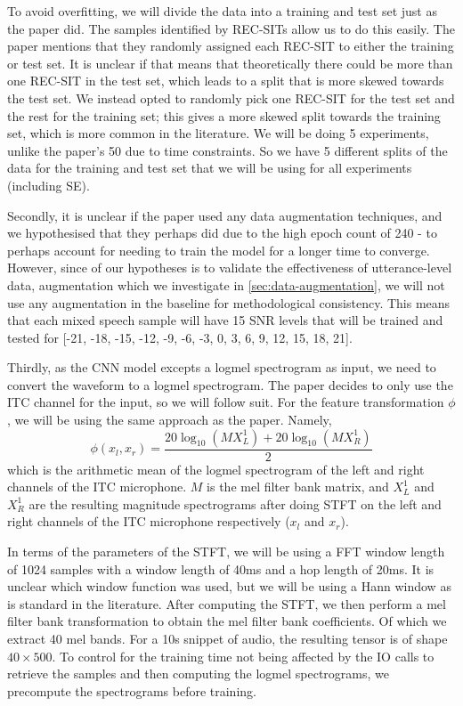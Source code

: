 \documentclass[logo,bsc,singlespacing,parskip,online]{infthesis}
\begin{document}
To avoid overfitting, we will divide the data into a training and test set just as the paper did.
The samples identified by REC-SITs allow us to do this easily. The paper mentions that they randomly 
assigned each REC-SIT to either the training or test set. It is unclear if 
that means that theoretically there could be more than one REC-SIT in the test set, which 
leads to a split that is more skewed towards the test set. We instead opted to randomly pick 
one REC-SIT for the test set and the rest for the training set; this gives a more 
skewed split towards the training set, which is more common in the literature.
We will be doing 5 experiments, unlike the paper's 50 due to time constraints. So 
we have 5 different splits of the data for the training and test set that we will be using 
for all experiments (including SE).

Secondly, it is unclear if the paper used any data augmentation techniques, and we 
hypothesised that they perhaps did due to the high epoch count of 240 - to perhaps 
account for needing to train the model for a longer time to converge. However,
since of our hypotheses is to validate the effectiveness of utterance-level data, 
augmentation which we investigate in \ref{sec:data-augmentation}, we will 
not use any augmentation in the baseline for methodological consistency. This means that each mixed speech sample will have 15
SNR levels that will be trained and tested for [-21, -18, -15, -12, -9, -6, -3, 0, 3, 6, 9, 12, 15, 18, 21].

Thirdly, as the CNN model excepts a logmel spectrogram as input, we need to convert the waveform
to a logmel spectrogram. The paper decides to only use the ITC channel for the input, so we 
will follow suit.
For the feature transformation \(\phi\), we will be using the same approach as the paper. Namely, 
\begin{equation}
\phi(x_l, x_r) = \frac{20\log_{10}\left(M X_{L}^{1} \right) + 20\log_{10}\left(M X_{R}^{1}\right)}{2}
\label{eq:logmel}
\end{equation}
which is the arithmetic mean of the logmel spectrogram of the left and right channels of the ITC microphone.
$M$ is the mel filter bank matrix, and $X_{L}^{1}$ and $X_{R}^{1}$ are
the resulting magnitude spectrograms after doing STFT on the left and right channels of the ITC microphone respectively ($x_l$ and $x_r$).

In terms of the parameters of the STFT, we will be using a FFT window length of 1024 samples with a window length of 40ms and a hop length of 20ms. It is 
unclear which window function was used, but we will be using a Hann window as is standard in the literature.
After computing the STFT, we then perform a mel filter bank transformation to obtain the mel filter bank coefficients. 
Of which we extract 40 mel bands. For a 10s snippet of audio, the resulting tensor is of shape $40 \times 500$.
To control for the training time not being affected by the IO 
calls to retrieve the samples and then computing the logmel spectrograms,
we precompute the spectrograms before training.
\end{document}
